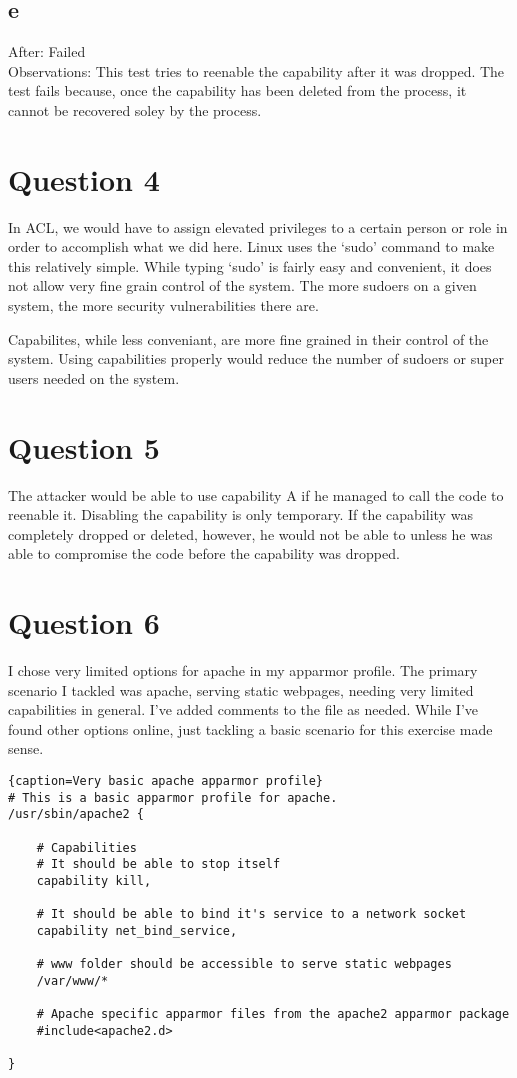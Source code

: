 \documentclass[10pt,letterpaper]{article}
\begin{document}
\subsection*{e}
After: Failed\\
Observations: This test tries to reenable the capability after it was dropped.
The test fails because, once the capability has been deleted from the process,
it cannot be recovered soley by the process.

\section*{Question 4}
In ACL, we would have to assign elevated privileges to a certain person or
role in order to accomplish what we did here. Linux uses the `sudo' command
to make this relatively simple. While typing `sudo' is fairly easy and convenient,
it does not allow very fine grain control of the system. The more sudoers on a
given system, the more security vulnerabilities there are.

Capabilites, while less conveniant, are more fine grained in their control of
the system. Using capabilities properly would reduce the number of sudoers or
super users needed on the system.

\section*{Question 5}
The attacker would be able to use capability A if he managed to call the code
to reenable it. Disabling the capability is only temporary.
If the capability was completely dropped or deleted, however, he would not be
able to unless he was able to compromise the code before the capability was
dropped.

\section*{Question 6}
I chose very limited options for apache in my apparmor profile. The primary
scenario I tackled was apache, serving static webpages, needing very limited
capabilities in general. I've added comments to the file as needed. While I've
found other options online, just tackling a basic scenario for this exercise
made sense. 

\begin{lstlisting}{caption=Very basic apache apparmor profile}
# This is a basic apparmor profile for apache.
/usr/sbin/apache2 {
	
	# Capabilities
	# It should be able to stop itself
	capability kill,
	
	# It should be able to bind it's service to a network socket
	capability net_bind_service,

	# www folder should be accessible to serve static webpages
	/var/www/*

	# Apache specific apparmor files from the apache2 apparmor package
	#include<apache2.d>
	
}
\end{lstlisting}
\end{document}
